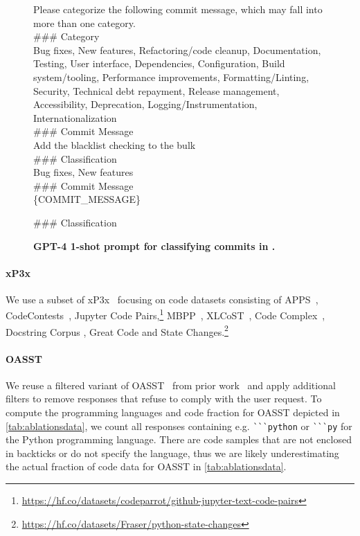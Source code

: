 \begin{figure}[htbp]
\hrulefill

Please categorize the following commit message, which may fall into more than one category. \\

\#\#\# Category \\
Bug fixes, New features, Refactoring/code cleanup, Documentation, Testing, User interface, Dependencies, Configuration, Build system/tooling, Performance improvements, Formatting/Linting, Security, Technical debt repayment, Release management, Accessibility, Deprecation, Logging/Instrumentation, Internationalization \\

\#\#\# Commit Message \\
Add the blacklist checking to the bulk \\

\#\#\# Classification \\
Bug fixes, New features \\

\#\#\# Commit Message \\
\{COMMIT\_MESSAGE\} 

\#\#\# Classification \\

\hrulefill
\caption[]{\textbf{GPT-4 1-shot prompt for classifying commits in \dataft{}.}}
\label{fig:commitdomain}
\end{figure}


\paragraph{xP3x} We use a subset of xP3x~\citep{muennighoff2022crosslingual} focusing on code datasets consisting of APPS~\citep{hendrycks2021measuring}, CodeContests~\citep{li2022competition}, Jupyter Code Pairs,\footnote{\url{https://hf.co/datasets/codeparrot/github-jupyter-text-code-pairs}} MBPP~\citep{austin2021program}, XLCoST~\citep{zhu2022xlcost}, Code Complex~\citep{JeonBHHK22}, Docstring Corpus \citep{barone2017parallel}, Great Code \citep{hellendoorn2019global} and State Changes.\footnote{\url{https://hf.co/datasets/Fraser/python-state-changes}}

\paragraph{OASST} We reuse a filtered variant of OASST~\citep{kopf2023openassistant} from prior work~\citep{dettmers2023qlora} and apply additional filters to remove responses that refuse to comply with the user request. To compute the programming languages and code fraction for OASST depicted in \autoref{tab:ablationsdata}, we count all responses containing e.g. \verb|```python| or \verb|```py| for the Python programming language. There are code samples that are not enclosed in backticks or do not specify the language, thus we are likely underestimating the actual fraction of code data for OASST in \autoref{tab:ablationsdata}.

